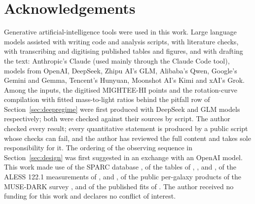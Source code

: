 \documentclass[fleqn,usenatbib]{mnras}
\begin{document}
\section*{Acknowledgements}
Generative artificial-intelligence tools were used in this work. Large language models assisted with writing code and analysis scripts, with literature checks, with transcribing and digitising published tables and figures, and with drafting the text: Anthropic's Claude (used mainly through the Claude Code tool), models from OpenAI, DeepSeek, Zhipu AI's GLM, Alibaba's Qwen, Google's Gemini and Gemma, Tencent's Hunyuan, Moonshot AI's Kimi and xAI's Grok. Among the inputs, the digitised MIGHTEE-HI points and the rotation-curve compilation with fitted mass-to-light ratios behind the pitfall row of Section~\ref{sec:deepregime} were first produced with DeepSeek and GLM models respectively; both were checked against their sources by script. The author checked every result; every quantitative statement is produced by a public script whose checks can fail, and the author has reviewed the full content and takes sole responsibility for it. The ordering of the observing sequence in Section~\ref{sec:design} was first suggested in an exchange with an OpenAI model. This work made use of the SPARC database \citep{Lelli2016}, of the tables of \citet{NestorShachar2023}, \citet{Price2021}, \citet{Puglisi2023} and \citet{Lee2025}, of the ALESS 122.1 measurements of \citet{Amvrosiadis2025}, \citet{CalistroRivera2018} and \citet{Dunne2022}, of the public per-galaxy products of the MUSE-DARK survey \citep{Ciocan2026}, and of the published fits of \citet{Varasteanu2026}. The author received no funding for this work and declares no conflict of interest.
\end{document}
